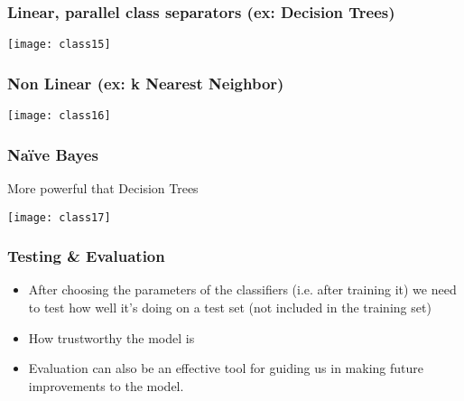 \begin{frame}[fragile]
  \frametitle{Linear, parallel class separators (ex: Decision Trees)}
\begin{center}
\texttt{[image: class15]}
\end{center}
\end{frame}

\begin{frame}[fragile]
  \frametitle{Non Linear (ex: k Nearest Neighbor)}
\begin{center}
\texttt{[image: class16]}
\end{center}
\end{frame}

\begin{frame}[fragile]
  \frametitle{Naïve Bayes}
More powerful that Decision Trees
\begin{center}
\texttt{[image: class17]}
\end{center}
\end{frame}

\begin{frame}[fragile]
  \frametitle{Testing \& Evaluation}
\begin{itemize}
\item After choosing the parameters of the classifiers (i.e. after training it) we need to test how well it's doing on a test set (not included in the training set)
\item How trustworthy the model is
\item Evaluation can also be an effective tool for guiding us in making future improvements to the model. 

\end{itemize}
\end{frame}

